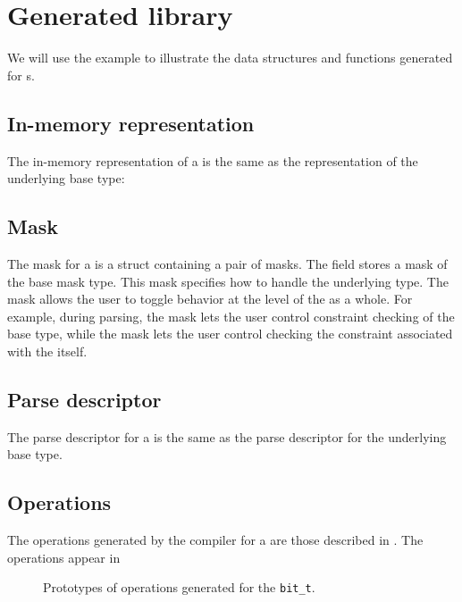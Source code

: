 \section{Generated library}
We will use the  example to illustrate the data structures
and functions generated for \ptypedef{}s.

\subsection{In-memory representation}
\label{sec:typedefs-rep}
The in-memory representation of a \ptypedef{} is the same as the
representation of the underlying base type:


\subsection{Mask}
\label{sec:typedefs-masks}
The mask for a \Ptypedef{} is a \C{} struct containing a pair of masks.  The
 field stores a mask of the base mask type.  This
mask specifies how to handle the underlying type.  The
 mask allows the user to toggle behavior at the level
of the \Ptypedef{} as a whole.  For example, during parsing, the
 mask lets the user control constraint checking of the
base type, while the
 mask lets the user control checking the constraint
associated with the \Ptypedef{} itself.


\subsection{Parse descriptor}
\label{sec:typedefs-parse-descriptors}
The parse descriptor for a \Ptypedef{} is the same as the parse
descriptor for the underlying base type.

\subsection{Operations}
The operations generated by the \pads{} compiler for a \Ptypedef{} are
those described in .
The operations appear in 
\begin{figure}
\caption{Prototypes of operations generated for
  the \Ptypedef{} \texttt{bit\_t}.}
\label{figure:typedef-ops}
\end{figure}


